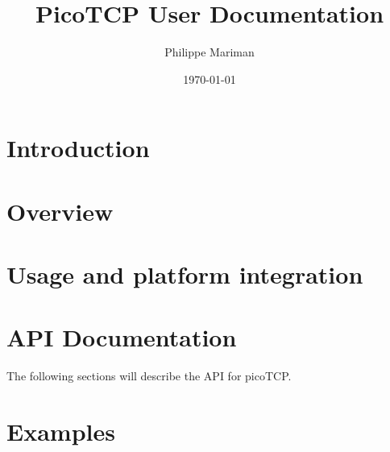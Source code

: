 %






\usepackage{draftwatermark}




\title{PicoTCP User Documentation}
\author{Philippe Mariman}
\date{\today}
\maketitle

\thispagestyle{empty}



\tableofcontents

\chapter{Introduction}
\label{chap:intro}
%

\chapter{Overview}
\label{chap:overview}
%


\chapter{Usage and platform integration}
\label{chap:usage}
%


\chapter{API Documentation}
\label{chap:api_doc}
The following sections will describe the API for picoTCP.



\chapter{Examples}
\label{chap:examples}
%




